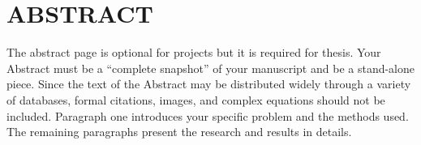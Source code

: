 
\chapter*{ABSTRACT}
\vspace{7mm}
The abstract page is optional for projects but it is required for thesis. Your Abstract must be a “complete snapshot” of your manuscript and be a stand-alone piece. Since the text of the Abstract may be distributed widely through a variety of databases, formal citations, images, and complex equations should not be included. Paragraph one introduces your specific problem and the methods used. The remaining paragraphs present the research and results in details.

 